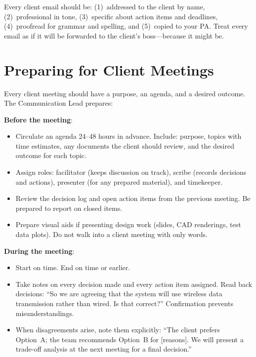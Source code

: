 \begin{tipbox}
Every client email should be: (1)~addressed to the client by name, (2)~professional in tone, (3)~specific about action items and deadlines, (4)~proofread for grammar and spelling, and (5)~copied to your PA. Treat every email as if it will be forwarded to the client's boss---because it might be.
\end{tipbox}



\section{Preparing for Client Meetings}
Every client meeting should have a purpose, an agenda, and a desired outcome. The Communication Lead prepares:

\textbf{Before the meeting}:
\begin{itemize}[nosep,leftmargin=1.5em]
\item Circulate an agenda 24--48 hours in advance. Include: purpose, topics with time estimates, any documents the client should review, and the desired outcome for each topic.
\item Assign roles: facilitator (keeps discussion on track), scribe (records decisions and actions), presenter (for any prepared material), and timekeeper.
\item Review the decision log and open action items from the previous meeting. Be prepared to report on closed items.
\item Prepare visual aids if presenting design work (slides, CAD renderings, test data plots). Do not walk into a client meeting with only words.
\end{itemize}

\textbf{During the meeting}:
\begin{itemize}[nosep,leftmargin=1.5em]
\item Start on time. End on time or earlier.
\item Take notes on every decision made and every action item assigned. Read back decisions: ``So we are agreeing that the system will use wireless data transmission rather than wired. Is that correct?'' Confirmation prevents misunderstandings.
\item When disagreements arise, note them explicitly: ``The client prefers Option~A; the team recommends Option~B for [reasons]. We will present a trade-off analysis at the next meeting for a final decision.''
\end{itemize}

